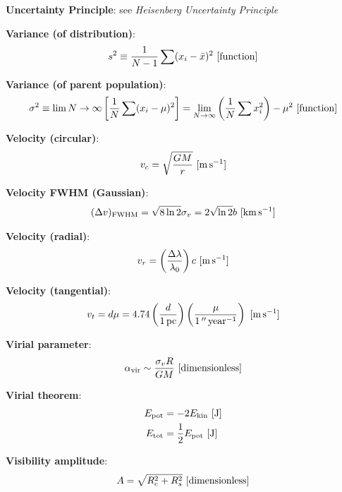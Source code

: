 \documentclass[a4paper,10pt]{article}
\begin{document}
{\noindent}\textbf{Uncertainty Principle}: see \textit{Heisenberg Uncertainty Principle}

{\noindent}\textbf{Variance (of distribution)}:
\begin{align*}
    s^2 \equiv \frac{1}{N-1} \sum (x_i-\bar{x})^2 ~ [{\rm function}]
\end{align*}

{\noindent}\textbf{Variance (of parent population)}:
\begin{align*}
    \sigma^2 \equiv \lim{N\rightarrow\infty} \left[\frac{1}{N}\sum(x_i-\mu)^2\right] = \lim_{N\rightarrow\infty} \left(\frac{1}{N}\sum x_i^2\right)-\mu^2 ~ [{\rm function}]
\end{align*}

{\noindent}\textbf{Velocity (circular)}:
\begin{align*}
    v_c = \sqrt{\frac{GM}{r}} ~ [{\rm m\,s^{-1}}]
\end{align*}

{\noindent}\textbf{Velocity FWHM (Gaussian)}:
\begin{align*}
    (\Delta v)_{\rm FWHM} = \sqrt{8\ln2}\sigma_v = 2\sqrt{\ln2}b ~ [{\rm km\,s^{-1}}]
\end{align*}

{\noindent}\textbf{Velocity (radial)}:
\begin{align*}
    v_r = \left(\frac{\Delta\lambda}{\lambda_0}\right)c ~ [{\rm m\,s^{-1}}]
\end{align*}

{\noindent}\textbf{Velocity (tangential)}:
\begin{align*}
    v_t = d\mu = 4.74\left(\frac{d}{1\,{\rm pc}}\right) \left(\frac{\mu}{1\,''\,{\rm year^{-1}}}\right) ~ [{\rm m\,s^{-1}}]
\end{align*}

{\noindent}\textbf{Virial parameter}:
\begin{align*}
    \alpha_\mathrm{vir} \sim \frac{\sigma_vR}{GM} ~ [{\rm dimensionless}]
\end{align*}

{\noindent}\textbf{Virial theorem}:
\begin{align*}
    E_\mathrm{pot} &= -2E_\mathrm{kin} ~ [{\rm J}] \\
    E_\mathrm{tot} &= \frac{1}{2}E_\mathrm{pot} ~ [{\rm J}]
\end{align*}

{\noindent}\textbf{Visibility amplitude}:
\begin{align*}
    A = \sqrt{R_c^2 + R_s^2} ~ [{\rm dimensionless}]
\end{align*}
\end{document}
